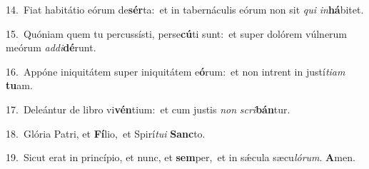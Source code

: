 {\numbfont\textcolor{\numbcolor}{14.}}~Fiat habitátio eórum de\-\textbf{sér}\-ta:~\star et in tabernáculis eórum non sit \textit{qui} \textit{in}\-\textbf{há}bitet.\par
{\numbfont\textcolor{\numbcolor}{15.}}~Quóniam quem tu percussísti, perse\-\textbf{cú}\-ti sunt:~\star et super dolórem vúlnerum meórum \textit{ad}\-\textit{di}\textbf{dé}runt.\par
{\numbfont\textcolor{\numbcolor}{16.}}~Appóne iniquitátem super iniquitátem e\-\textbf{ó}\-rum:~\star et non intrent in justí\-\textit{ti}\-\textit{am} \textbf{tu}\-am.\par
{\numbfont\textcolor{\numbcolor}{17.}}~Deleántur de libro vi\-\textbf{vén}\-tium:~\star et cum justis \textit{non} \textit{scri}\-\textbf{bán}tur.\par
{\numbfont\textcolor{\numbcolor}{18.}}~Glória Patri, et \textbf{Fí}\-lio,~\star et Spirí\-\textit{tu}\-\textit{i} \textbf{Sanc}\-to.\par
{\numbfont\textcolor{\numbcolor}{19.}}~Sicut erat in princípio, et nunc, et \textbf{sem}\-per,~\star et in sǽcula sæcu\-\textit{ló}\-\textit{rum}. \textbf{A}\-men.\par
